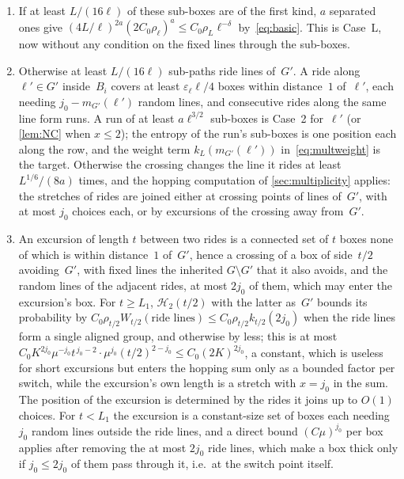 \documentclass[11pt,letterpaper]{article}
\begin{document}
\begin{enumerate}
  \item If at least $L/(16\ell)$ of these sub-boxes are of the first kind, $a$ separated ones give $(4L/\ell)^{2a}(2C_0\rho_\ell)^a\le C_0\rho_L\ell^{-\delta}$ by~\eqref{eq:basic}. This is Case~L, now without any condition on the fixed lines through the sub-boxes.
  \item Otherwise at least $L/(16\ell)$ sub-paths ride lines of~$G'$. A ride along $\ell'\in G'$ inside~$B_i$ covers at least $\varepsilon_\ell\ell/4$ boxes within distance~$1$ of~$\ell'$, each needing $j_0-m_{G'}(\ell')$ random lines, and consecutive rides along the same line form runs. A run of at least $a\ell^{3/2}$ sub-boxes is Case~2 for~$\ell'$ (or \cref{lem:NC} when $x\le2$); the entropy of the run's sub-boxes is one position each along the row, and the weight term $k_L(m_{G'}(\ell'))$ in~\eqref{eq:multweight} is the target. Otherwise the crossing changes the line it rides at least $L^{1/6}/(8a)$ times, and the hopping computation of \cref{sec:multiplicity} applies: the stretches of rides are joined either at crossing points of lines of~$G'$, with at most $j_0$ choices each, or by excursions of the crossing away from~$G'$.
  \item An excursion of length $t$ between two rides is a connected set of $t$ boxes none of which is within distance~$1$ of~$G'$, hence a crossing of a box of side~$t/2$ avoiding~$G'$, with fixed lines the inherited $G\setminus G'$ that it also avoids, and the random lines of the adjacent rides, at most $2j_0$ of them, which may enter the excursion's box. For $t\ge L_1$, $\mathcal H_2(t/2)$ with the latter as~$G'$ bounds its probability by $C_0\rho_{t/2}W_{t/2}(\text{ride lines})\le C_0\rho_{t/2}k_{t/2}(2j_0)$ when the ride lines form a single aligned group, and otherwise by less; this is at most $C_0K^{2j_0}\mu^{-j_0}t^{\,j_0-2}\cdot\mu^{j_0}(t/2)^{2-j_0}\le C_0(2K)^{2j_0}$, a constant, which is useless for short excursions but enters the hopping sum only as a bounded factor per switch, while the excursion's own length is a stretch with $x=j_0$ in the sum. The position of the excursion is determined by the rides it joins up to $O(1)$ choices. For $t<L_1$ the excursion is a constant-size set of boxes each needing $j_0$ random lines outside the ride lines, and a direct bound $(C\mu)^{j_0}$ per box applies after removing the at most $2j_0$ ride lines, which make a box thick only if $j_0\le2j_0$ of them pass through it, i.e.\ at the switch point itself.
\end{enumerate}
\end{document}
